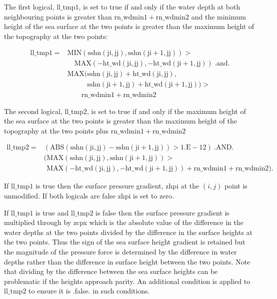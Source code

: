 \documentclass[../main/NEMO_manual]{subfiles}
\begin{document}
The first logical, $\mathrm{ll\_tmp1}$, is set to true if and only if the water depth at
both neighbouring points is greater than $\mathrm{rn\_wdmin1} + \mathrm{rn\_wdmin2}$ and
the minimum height of the sea surface at the two points is greater than the maximum height
of the topography at the two points:

\begin{equation}
  \label{eq:DYN_ll_tmp1}
  \begin{split}
    \mathrm{ll\_tmp1}  = & \mathrm{MIN(sshn(ji,jj), sshn(ji+1,jj))} > \\
                     & \quad \mathrm{MAX(-ht\_wd(ji,jj), -ht\_wd(ji+1,jj))\  .and.} \\
                     & \mathrm{MAX(sshn(ji,jj) + ht\_wd(ji,jj),} \\
                     & \mathrm{\phantom{MAX(}sshn(ji+1,jj) + ht\_wd(ji+1,jj))} >\\
                     & \quad\quad\mathrm{rn\_wdmin1 + rn\_wdmin2 }
  \end{split}
\end{equation}

The second logical, $\mathrm{ll\_tmp2}$, is set to true if and only if the maximum height
of the sea surface at the two points is greater than the maximum height of the topography
at the two points plus $\mathrm{rn\_wdmin1} + \mathrm{rn\_wdmin2}$

\begin{equation}
  \label{eq:DYN_ll_tmp2}
  \begin{split}
    \mathrm{ ll\_tmp2 } = & \mathrm{( ABS( sshn(ji,jj) - sshn(ji+1,jj) ) > 1.E-12 )\ .AND.}\\
    & \mathrm{( MAX(sshn(ji,jj), sshn(ji+1,jj)) > } \\
    & \mathrm{\phantom{(} MAX(-ht\_wd(ji,jj), -ht\_wd(ji+1,jj)) + rn\_wdmin1 + rn\_wdmin2}) .
  \end{split}
\end{equation}

If $\mathrm{ll\_tmp1}$ is true then the surface pressure gradient, zhpi at the $(i,j)$
point is unmodified. If both logicals are false zhpi is set to zero.

If $\mathrm{ll\_tmp1}$ is true and $\mathrm{ll\_tmp2}$ is false then the surface pressure
gradient is multiplied through by zcpx which is the absolute value of the difference in
the water depths at the two points divided by the difference in the surface heights at the
two points. Thus the sign of the sea surface height gradient is retained but the magnitude
of the pressure force is determined by the difference in water depths rather than the
difference in surface height between the two points. Note that dividing by the difference
between the sea surface heights can be problematic if the heights approach parity. An
additional condition is applied to $\mathrm{ ll\_tmp2 }$ to ensure it is .false. in such
conditions.
\end{document}
